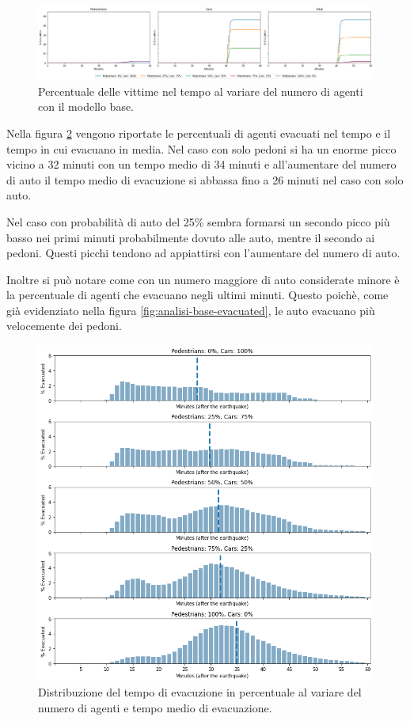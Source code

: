 \begin{figure}[ht]
    \centering
    \includegraphics[width=\textwidth]{images/analisi/base-casualties.png}
    \caption{
        Percentuale delle vittime nel tempo al variare del numero di agenti con il modello base.
    }
    \label{fig:analisi-base-casualties}
\end{figure}

Nella figura \ref{fig:analisi-base-evtimes} vengono riportate le percentuali di agenti evacuati nel tempo e il tempo in cui evacuano in media.
%
Nel caso con solo pedoni si ha un enorme picco vicino a 32 minuti con un tempo medio di 34 minuti e all'aumentare del numero di auto
il tempo medio di evacuzione si abbassa fino a 26 minuti nel caso con solo auto.

Nel caso con probabilità di auto del 25\% sembra formarsi un secondo picco più basso nei primi minuti probabilmente dovuto alle auto, mentre il secondo ai pedoni.
Questi picchi tendono ad appiattirsi con l'aumentare del numero di auto.

Inoltre si può notare come con un numero maggiore di auto considerate minore è la percentuale di agenti che evacuano negli ultimi minuti.
Questo poichè, come già evidenziato nella figura \ref{fig:analisi-base-evacuated}, le auto evacuano più velocemente dei pedoni.

\begin{figure}
    \centering
    \includegraphics[width=\textwidth]{images/analisi/base-evtimes.png}
    \caption{
        Distribuzione del tempo di evacuzione in percentuale al variare del numero di agenti e tempo medio di evacuazione.
    }
    \label{fig:analisi-base-evtimes}
\end{figure}

